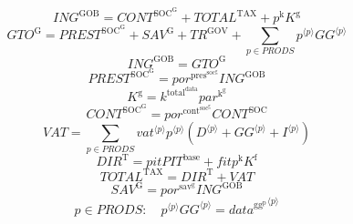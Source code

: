 \begin{equation}
{I\!N\!G}^{\mathrm{GOB}} = {C\!O\!N\!T}^{\mathrm{SOC}^{\mathrm{G}}} + {T\!O\!T\!A\!L}^{\mathrm{TAX}} + {p^{\mathrm{k}}} {K^{\mathrm{g}}}
\end{equation}
\begin{equation}
{G\!T\!O}^{\mathrm{G}} = {P\!R\!E\!S\!T}^{\mathrm{SOC}^{\mathrm{G}}} + {S\!A\!V}^{\mathrm{G}} + {T\!R}^{\mathrm{GOV}} + \sum_{p\in {P\!R\!O\!D\!S}} {{p}^{\langle p\rangle}} {{{G\!G}}^{\langle p\rangle}}
\end{equation}
\begin{equation}
{I\!N\!G}^{\mathrm{GOB}} = {G\!T\!O}^{\mathrm{G}}
\end{equation}
\begin{equation}
{P\!R\!E\!S\!T}^{\mathrm{SOC}^{\mathrm{G}}} = {{p\!o\!r}^{\mathrm{pres}^{\mathrm{soc}^{\mathrm{g}}}}} {{I\!N\!G}^{\mathrm{GOB}}}
\end{equation}
\begin{equation}
K^{\mathrm{g}} = {k^{\mathrm{total}^{\mathrm{data}}}} {{p\!a\!r}^{\mathrm{k}^{\mathrm{g}}}}
\end{equation}
\begin{equation}
{C\!O\!N\!T}^{\mathrm{SOC}^{\mathrm{G}}} = {{p\!o\!r}^{\mathrm{cont}^{\mathrm{soc}^{\mathrm{g}}}}} {{C\!O\!N\!T}^{\mathrm{SOC}}}
\end{equation}
\begin{equation}
{V\!A\!T} = \sum_{p\in {P\!R\!O\!D\!S}} {{{v\!a\!t}}^{\langle p\rangle}} {{p}^{\langle p\rangle}} \left({D}^{\langle p\rangle} + {{G\!G}}^{\langle p\rangle} + {I}^{\langle p\rangle}\right)
\end{equation}
\begin{equation}
{D\!I\!R}^{\mathrm{T}} = {{p\!i\!t}} {{P\!I\!T}^{\mathrm{base}}} + {{f\!i\!t}} {p^{\mathrm{k}}} {K^{\mathrm{f}}}
\end{equation}
\begin{equation}
{T\!O\!T\!A\!L}^{\mathrm{TAX}} = {D\!I\!R}^{\mathrm{T}} + {V\!A\!T}
\end{equation}
\begin{equation}
{S\!A\!V}^{\mathrm{G}} = {{p\!o\!r}^{\mathrm{sav}^{\mathrm{g}}}} {{I\!N\!G}^{\mathrm{GOB}}}
\end{equation}
\begin{equation}
p\in {P\!R\!O\!D\!S}\colon\quad {{p}^{\langle p\rangle}} {{{G\!G}}^{\langle p\rangle}} = {{d\!a\!t\!a}^{\mathrm{gg}^{\mathrm{p}}}}^{\langle p\rangle}
\end{equation}




